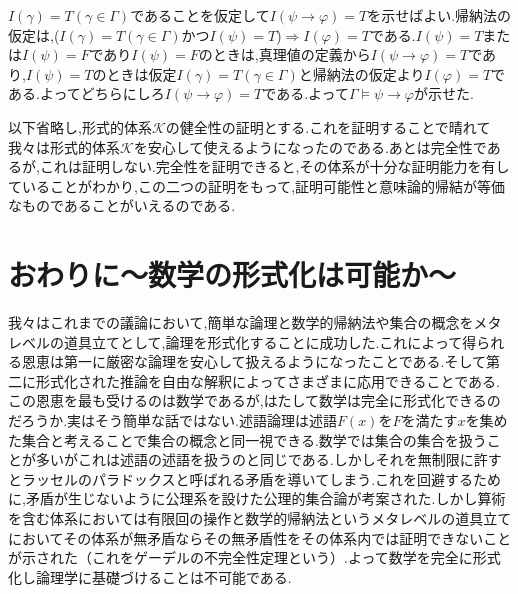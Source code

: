 \documentclass[10pt,b5paper,papersize,dvipdfmx]{jsbook}
\begin{document}
$I(\gamma)=T(\gamma \in \Gamma)$であることを仮定して$I(\psi \to \varphi)=T$を示せばよい.帰納法の仮定は,($I(\gamma)=T(\gamma \in \Gamma)$かつ$I(\psi)=T$)$\Rightarrow$$I(\varphi)=T$である.$I(\psi) = T$または$I(\psi) = F$であり$I(\psi) = F$のときは,真理値の定義から$I(\psi \to \varphi)=T$であり,$I(\psi) = T$のときは仮定$I(\gamma)=T(\gamma \in \Gamma)$と帰納法の仮定より$I(\varphi)=T$である.よってどちらにしろ$I(\psi \to \varphi)=T$である.よって$\Gamma \models \psi \to \varphi$が示せた.\par
以下省略し,形式的体系$\mathcal K$の健全性の証明とする.これを証明することで晴れて我々は形式的体系$\mathcal K$を安心して使えるようになったのである.あとは完全性であるが,これは証明しない.完全性を証明できると,その体系が十分な証明能力を有していることがわかり,この二つの証明をもって,証明可能性と意味論的帰結が等価なものであることがいえるのである.

\section{おわりに～数学の形式化は可能か～}
我々はこれまでの議論において,簡単な論理と数学的帰納法や集合の概念をメタレベルの道具立てとして,論理を形式化することに成功した.これによって得られる恩恵は第一に厳密な論理を安心して扱えるようになったことである.そして第二に形式化された推論を自由な解釈によってさまざまに応用できることである.この恩恵を最も受けるのは数学であるが,はたして数学は完全に形式化できるのだろうか.実はそう簡単な話ではない.述語論理は述語$F(x)$を$F$を満たす$x$を集めた集合と考えることで集合の概念と同一視できる.数学では集合の集合を扱うことが多いがこれは述語の述語を扱うのと同じである.しかしそれを無制限に許すとラッセルのパラドックスと呼ばれる矛盾を導いてしまう.これを回避するために,矛盾が生じないように公理系を設けた公理的集合論が考案された.しかし算術を含む体系においては有限回の操作と数学的帰納法というメタレベルの道具立てにおいてその体系が無矛盾ならその無矛盾性をその体系内では証明できないことが示された（これをゲーデルの不完全性定理という）.よって数学を完全に形式化し論理学に基礎づけることは不可能である.
\end{document}
